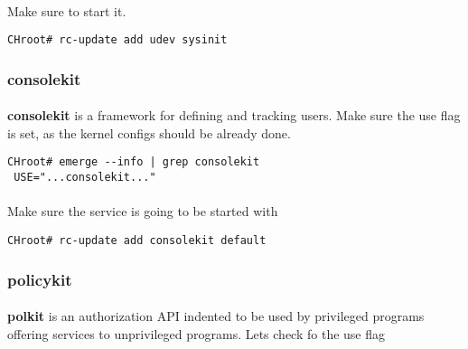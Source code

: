 \documentclass[10pt,a4paper]{article}
\begin{document}
                    \paragraph{} Make sure to start it.
                    
                    \begin{lstlisting}[style=BashInputCHRoot]
 CHroot# rc-update add udev sysinit
                    \end{lstlisting}
                    
                \newpage
                \subsubsection{consolekit}
                
                    \paragraph{} \textbf{consolekit} is a framework for defining and tracking users. Make sure the use flag is set, as the kernel configs should be already done.
                    
                    \begin{lstlisting}[style=BashInputCHRoot]
 CHroot# emerge --info | grep consolekit
 USE="...consolekit..."
                    \end{lstlisting}
                    
                    \paragraph{} Make sure the service is going to be started with 
                    
                    \begin{lstlisting}[style=BashInputCHRoot]
 CHroot# rc-update add consolekit default
                    \end{lstlisting}
                    
                \newpage
                \subsubsection{policykit}
                
                    \paragraph{} \textbf{polkit} is an authorization API indented to be used by privileged programs offering services to unprivileged programs. Lets check fo the use flag
                    
\end{document}

